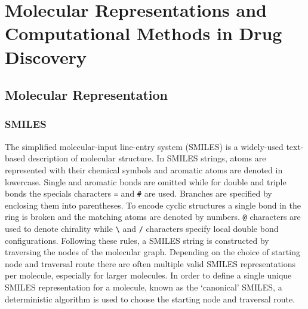 \chapter{Molecular Representations and Computational Methods in Drug Discovery} \label{ch:background}

\section{Molecular Representation}

\subsection{SMILES}
The simplified molecular-input line-entry system (SMILES) \cite{Weininger1988, Weininger1989} is a widely-used text-based description of molecular structure. In SMILES strings, atoms are represented with their chemical symbols and aromatic atoms are denoted in lowercase. Single and aromatic bonds are omitted while for double and triple bonds the specials characters \texttt{=} and \texttt{\#} are used. Branches are specified by enclosing them into parentheses. To encode cyclic structures a single bond in the ring is broken and the matching atoms are denoted by numbers. \texttt{@} characters are used to denote chirality while \texttt{\textbackslash} and \texttt{/} characters specify local double bond configurations. Following these rules, a SMILES string is constructed by traversing the nodes of the molecular graph. Depending on the choice of starting node and traversal route there are often multiple valid SMILES representations per molecule, especially for larger molecules. In order to define a single unique SMILES representation for a molecule, known as the `canonical' SMILES, a deterministic algorithm is used to choose the starting node and traversal route.

